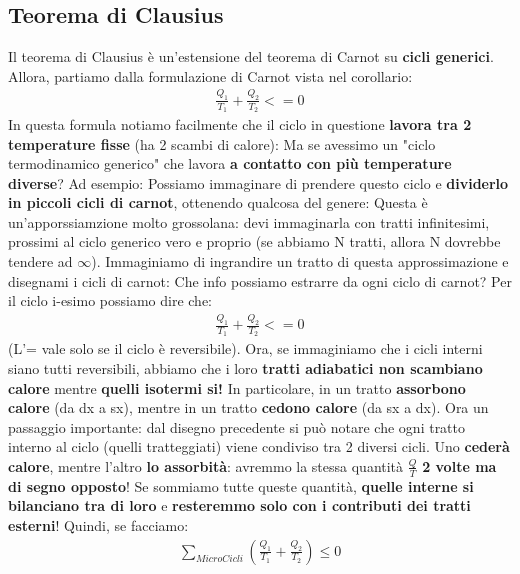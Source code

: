         \subsection{Teorema di Clausius}
            Il teorema di Clausius è un'estensione del teorema di Carnot su \textbf{cicli generici}. Allora, partiamo dalla formulazione di Carnot vista nel corollario:
            \begin{align*}
                \frac{Q_1}{T_1}+ \frac{Q_2}{T_2} <= 0
            \end{align*}
            In questa formula notiamo facilmente che il ciclo in questione \textbf{lavora tra 2 temperature fisse} (ha 2 scambi di calore):
            Ma se avessimo un "ciclo termodinamico generico" che lavora \textbf{a contatto con più temperature diverse}? Ad esempio:
            Possiamo immaginare di prendere questo ciclo e \textbf{dividerlo in piccoli cicli di carnot}, ottenendo qualcosa del genere:
            Questa è un'apporssiamzione molto grossolana: devi immaginarla con tratti infinitesimi, prossimi al ciclo generico vero e proprio (se abbiamo N tratti, allora N dovrebbe tendere ad $\infty$).  Immaginiamo di ingrandire un tratto di questa approssimazione e disegnami i cicli di carnot:
            Che info possiamo estrarre da ogni ciclo di carnot? Per il ciclo i-esimo possiamo dire che:
            \begin{align*}
                \frac{Q_1}{T_1}+ \frac{Q_2}{T_2} <= 0
            \end{align*}
            (L'= vale solo se il ciclo è reversibile). Ora, se immaginiamo che i cicli interni siano tutti reversibili, abbiamo che i loro \textbf{tratti adiabatici non scambiano calore} mentre \textbf{quelli isotermi si!} In particolare, in un tratto \textbf{assorbono calore} (da dx a sx), mentre in un tratto \textbf{cedono calore} (da sx a dx). Ora un passaggio importante: dal disegno precedente si può notare che ogni tratto interno al ciclo (quelli tratteggiati) viene condiviso tra 2 diversi cicli. Uno \textbf{cederà calore}, mentre l'altro \textbf{lo assorbità}: avremmo la stessa quantità $\frac{Q}{T}$ \textbf{2 volte ma di segno opposto}! Se sommiamo tutte queste quantità, \textbf{quelle interne si bilanciano tra di loro} e \textbf{resteremmo solo con i contributi dei tratti esterni}! Quindi, se facciamo:
            \begin{align*}
                \sum_{MicroCicli}(\frac{Q_1}{T_1}+\frac{Q_2}{T_2}) \leq 0
            \end{align*}
